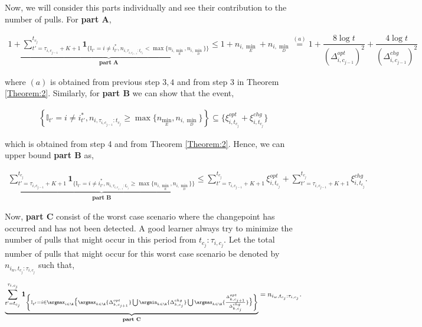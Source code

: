 \begin{customproof}{2}
Now, we will consider this parts individually and see their contribution to the number of pulls. For \textbf{part A},

\begin{align*}
\underbrace{1 + \sum_{t'=\tau_{i,c_{j-1}}+K+1}^{t_{c_j}}\mathbf{1}_{\lbrace\mathbb{I}_{t'}=i\neq i^*_{t'},n_{i,\tau_{i,c_{j-1}}:t_{c_j}} < \max\lbrace n_{i,\min_E}, n_{i,\min_D}\rbrace\rbrace}}_{\textbf{part A}} \leq 1 + n_{i,\min_E} + n_{i,\min_D} \overset{(a)}{=} 1 + \dfrac{8\log t}{(\Delta^{opt}_{i,c_{j-1}})^2} + \dfrac{4\log t}{(\Delta^{chg}_{i,c_{j-1}})^2}
\end{align*}

where $(a)$ is obtained from previous step $3,4$ and from step $3$ in Theorem \ref{Theorem:2}. Similarly, for \textbf{part B} we can show that the event,

\begin{align*}
\left\lbrace\mathbb{I}_{t'}=i\neq i^*_{t'},n_{i,\tau_{i,c_{j-1}}:t_{c_j}} \geq \max\lbrace n_{\min_E}, n_{i,\min_D}\rbrace\right\rbrace \subseteq \lbrace \xi^{opt}_{i,t_{c_j}} + \xi^{chg}_{i,t_{c_j}}  \rbrace
\end{align*}

which is obtained from step 4 and from Theorem \ref{Theorem:2}. Hence, we can upper bound \textbf{part B} as,

\begin{align*}
\underbrace{\sum_{t'=\tau_{i,c_{j-1}}+K+1}^{t_{c_j}}\mathbf{1}_{\lbrace\mathbb{I}_{t'}=i\neq i^*_{t'},n_{i,\tau_{i,c_{j-1}}:t_{c_j}} \geq \max\lbrace n_{i,\min_E}, n_{i,\min_D}\rbrace\rbrace}}_{\textbf{part B}} \leq \sum_{t'=\tau_{i,c_{j-1}}+K+1}^{t_{c_j}}\xi^{opt}_{i,t_{c_j}} + \sum_{t'=\tau_{i,c_{j-1}}+K+1}^{t_{c_j}}\xi^{chg}_{i,t_{c_j}}.
\end{align*}

Now, \textbf{part C} consist of the worst case scenario where the changepoint has occurred and has not been detected. A good learner always try to minimize the number of pulls that might occur in this period from $t_{c_j}:\tau_{i,c_j}$. Let the total number of pulls that might occur for this worst case scenario be denoted by $n_{i_{w},t_{c_j}:\tau_{i,c_j}}$ such that,

\begin{align*}
\underbrace{\sum_{t'=t_{c_j}}^{\tau_{i,c_j}}\mathbf{1}_{\left\lbrace\mathbb{I}_{t'}=i\in\argmax_{i\in\A}\big\lbrace\argmax_{k\in\A}\lbrace \Delta^{opt}_{k,c_{j+1}}\rbrace \bigcup \argmin_{k\in\A}\lbrace \Delta^{chg}_{k,c_j}\rbrace \bigcup \argmax_{k\in\A}\lbrace \frac{\Delta^{opt}_{k,c_{j+1}}}{\Delta^{chg}_{k,c_j}} \rbrace\big\rbrace \right\rbrace}}_{\textbf{part C}} = n_{i_{w},t_{c_j}:\tau_{i,c_j}}.
\end{align*}


\end{customproof}
